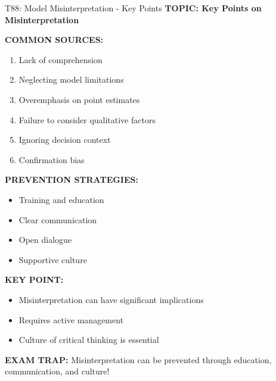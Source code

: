 \documentclass[8pt]{beamer}
\begin{document}
	\begin{frame}{T88: Model Misinterpretation - Key Points}
		\fontsize{6.5}{7.5}\selectfont
		\textbf{TOPIC: Key Points on Misinterpretation}
		
		\vspace{0.1cm}
		\textbf{COMMON SOURCES:}
		\begin{enumerate}
			\item Lack of comprehension
			\item Neglecting model limitations
			\item Overemphasis on point estimates
			\item Failure to consider qualitative factors
			\item Ignoring decision context
			\item Confirmation bias
		\end{enumerate}
		
		\vspace{0.1cm}
		\textbf{PREVENTION STRATEGIES:}
		\begin{itemize}
			\item Training and education
			\item Clear communication
			\item Open dialogue
			\item Supportive culture
		\end{itemize}
		
		\vspace{0.1cm}
		\textbf{KEY POINT:}
		\begin{itemize}
			\item Misinterpretation can have significant implications
			\item Requires active management
			\item Culture of critical thinking is essential
		\end{itemize}
		
		\textcolor{myred}{\textbf{EXAM TRAP:}} Misinterpretation can be prevented through \textcolor{myblue}{education, communication, and culture}!
	\end{frame}
	
\end{document}
